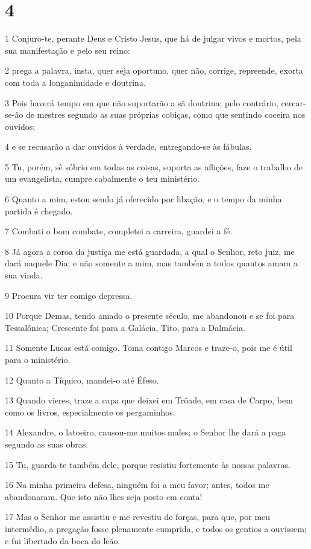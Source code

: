 \chapter{4}

\par 1 Conjuro-te, perante Deus e Cristo Jesus, que há de julgar vivos e mortos, pela sua manifestação e pelo seu reino:
\par 2 prega a palavra, insta, quer seja oportuno, quer não, corrige, repreende, exorta com toda a longanimidade e doutrina.
\par 3 Pois haverá tempo em que não suportarão a sã doutrina; pelo contrário, cercar-se-ão de mestres segundo as suas próprias cobiças, como que sentindo coceira nos ouvidos;
\par 4 e se recusarão a dar ouvidos à verdade, entregando-se às fábulas.
\par 5 Tu, porém, sê sóbrio em todas as coisas, suporta as aflições, faze o trabalho de um evangelista, cumpre cabalmente o teu ministério.
\par 6 Quanto a mim, estou sendo já oferecido por libação, e o tempo da minha partida é chegado.
\par 7 Combati o bom combate, completei a carreira, guardei a fé.
\par 8 Já agora a coroa da justiça me está guardada, a qual o Senhor, reto juiz, me dará naquele Dia; e não somente a mim, mas também a todos quantos amam a sua vinda.
\par 9 Procura vir ter comigo depressa.
\par 10 Porque Demas, tendo amado o presente século, me abandonou e se foi para Tessalônica; Crescente foi para a Galácia, Tito, para a Dalmácia.
\par 11 Somente Lucas está comigo. Toma contigo Marcos e traze-o, pois me é útil para o ministério.
\par 12 Quanto a Tíquico, mandei-o até Éfeso.
\par 13 Quando vieres, traze a capa que deixei em Trôade, em casa de Carpo, bem como os livros, especialmente os pergaminhos.
\par 14 Alexandre, o latoeiro, causou-me muitos males; o Senhor lhe dará a paga segundo as suas obras.
\par 15 Tu, guarda-te também dele, porque resistiu fortemente às nossas palavras.
\par 16 Na minha primeira defesa, ninguém foi a meu favor; antes, todos me abandonaram. Que isto não lhes seja posto em conta!
\par 17 Mas o Senhor me assistiu e me revestiu de forças, para que, por meu intermédio, a pregação fosse plenamente cumprida, e todos os gentios a ouvissem; e fui libertado da boca do leão.

